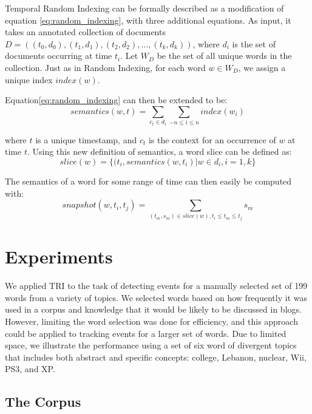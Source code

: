 \documentclass[a4paper,twocolumn,twoside,10pt]{ranlp}
\begin{document}
Temporal Random Indexing can be formally described as a modification of equation
\eqref{eq:random_indexing}, with three additional equations.  As input, it takes
an annotated collection of documents $D = ( (t_0, d_0), (t_1, d_1), (t_2, d_2),
..., (t_k, d_k))$, where $d_i$ is the set of documents occurring at time $t_i$.  Let
$W_D$ be the set of all unique words in the collection.  Just as in Random
Indexing, for each word $w \in W_D$, we assign a unique index $index(w)$.  

Equation\eqref{eq:random_indexing} can then be extended to be:
\begin{equation}\label{eq:tri_temporal_semantic}
  semantics(w, t) = \sum_{c_t \in d_i} \sum_{ -n \leq i \leq n} index(w_i)
\end{equation}

where $t$ is a unique timestamp, and $c_t$ is the context for an occurrence of
$w$ at time $t$.  Using this new definition of semantics, a word slice can be
defined as:
\begin{equation}\label{eq:tri_temporal_slice}
  slice(w) = \{ (t_i, semantics(w, t_i) | w \in d_i, i=1,k \}
\end{equation}

The semantics of a word for some range of time can then easily be computed with:
\begin{equation}\label{eq:tri_temporal_snapshot}
snapshot(w, t_i, t_j) = \sum_{(t_m, s_m) \in slice(w), t_i \leq t_m \leq t_j} s_m
\end{equation}


\section{Experiments}

We applied TRI to the task of detecting events for a manually selected set of
199 words from a variety of topics.  We selected words based on how frequently
it was used in a corpus and knowledge that it would be likely to be discussed in
blogs.  However, limiting the word selection was done for efficiency, and this
approach could be applied to tracking events for a larger set of words.  Due to
limited space, we illustrate the performance using a set of six word of
divergent topics that includes both abstract and specific concepts: college,
Lebanon, nuclear, Wii, PS3, and XP.

\subsection{The Corpus}
\label{sec:corpus}
\end{document}
